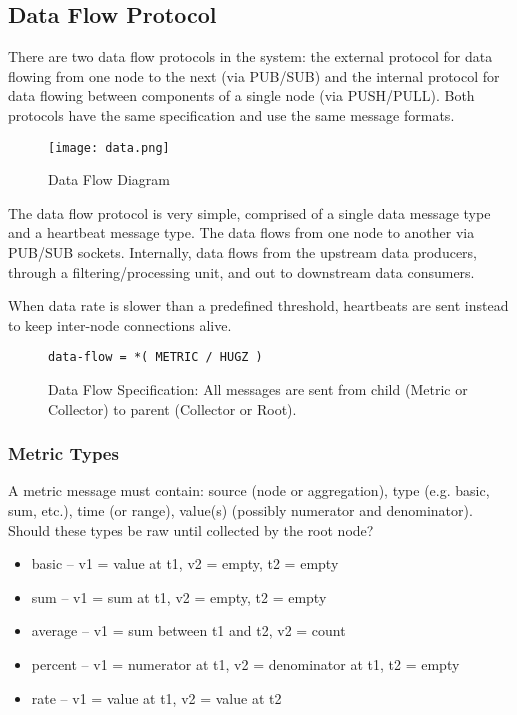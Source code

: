 \subsection{Data Flow Protocol}
\label{proto_data}

There are two data flow protocols in the \dcamp system: the external protocol for data flowing from one node to the next
(via PUB/SUB) and the internal protocol for data flowing between components of a single node (via PUSH/PULL). Both
protocols have the same specification and use the same message formats.

\begin{figure}[ht]
    \centering
    \texttt{[image: data.png]}
    \caption{Data Flow Diagram}
    \label{fig:proto_data_image}
\end{figure}

The \dcamp data flow protocol is very simple, comprised of a single data message type and a heartbeat message type. The
data flows from one node to another via PUB/SUB sockets. Internally, data flows from the upstream data producers,
through a filtering/processing unit, and out to downstream data consumers.

When data rate is slower than a predefined threshold, heartbeats are sent instead to keep inter-node connections alive.

\begin{figure}[ht]
\vspace{+10pt}
\begin{verbatim}
data-flow = *( METRIC / HUGZ )
\end{verbatim}
\vspace{-5pt}
\caption[Data Flow Specification]
	{Data Flow Specification: All messages are sent from child (Metric or Collector) to parent (Collector or Root).}
\label{fig:proto_data_spec}
\end{figure}

\subsubsection{Metric Types}

A metric message must contain: source (node or aggregation), type (e.g. basic, sum, etc.), time (or range), value(s)
(possibly numerator and denominator). Should these types be raw until collected by the root node?

\begin{itemize}
\item basic -- v1 = value at t1, v2 = empty, t2 = empty
\item sum -- v1 = sum at t1, v2 = empty, t2 = empty
\item average -- v1 = sum between t1 and t2, v2 = count
\item percent -- v1 = numerator at t1, v2 = denominator at t1, t2 = empty
\item rate -- v1 = value at t1, v2 = value at t2
\end{itemize}

